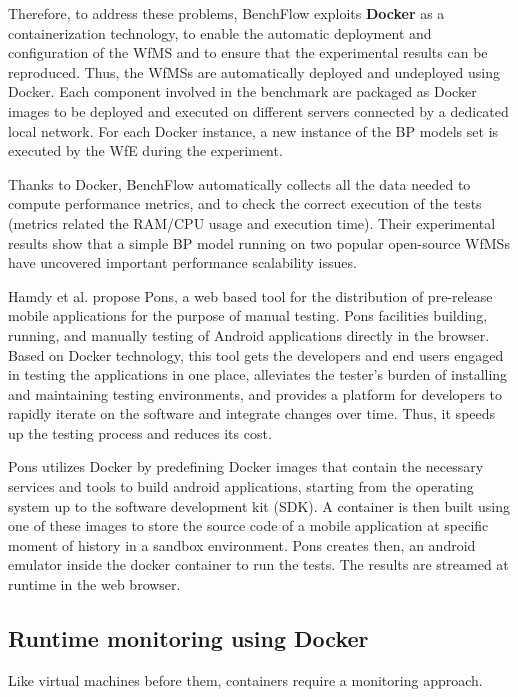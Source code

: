 Therefore, to address these problems, BenchFlow exploits \textbf{Docker} as a containerization technology, to enable the automatic deployment and configuration of the WfMS and to ensure that the experimental results can be reproduced.
Thus, the WfMSs are automatically deployed and undeployed using Docker. Each component involved in the benchmark are packaged as Docker images
to be deployed and executed on different servers connected by a dedicated local
network. For each Docker instance, a new instance of the BP models set is executed by the WfE during the experiment.

Thanks to Docker, BenchFlow automatically collects all the data needed to compute performance metrics, and to check the correct execution of the tests (metrics related the RAM/CPU usage and execution time).
Their experimental results show that a simple BP model running on two popular
open-source WfMSs have uncovered important performance scalability issues. 

Hamdy et al.\cite{hamdy2016web} propose Pons, a web based tool for the distribution of pre-release mobile
applications for the purpose of manual testing. Pons facilities building, running, and manually testing of Android applications directly in the browser. 
Based on Docker technology, this tool gets the developers and end users engaged in testing the applications in one
place, alleviates the tester's burden of installing and maintaining testing environments, and provides a platform for developers to rapidly iterate on the software and integrate changes over time. Thus, it speeds up the testing process and reduces its cost.

Pons utilizes Docker by predefining Docker images that
contain the necessary services and tools to build android
applications, starting from the operating system up to the
software development kit (SDK). A container is then built using one of these images to store the source code of
a mobile application at specific moment of history in a
sandbox environment. Pons creates then, an android emulator inside the docker container to run the tests. The results are streamed at runtime in the web browser.

\subsection{Runtime monitoring using Docker} 

Like virtual machines before them, containers require a monitoring approach. 

